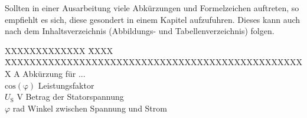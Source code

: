 \label{kap:symbole}

Sollten in einer Ausarbeitung viele Abkürzungen und Formelzeichen auftreten, so
empfiehlt es sich, diese gesondert in einem Kapitel aufzufuhren. Dieses kann auch nach
dem Inhaltsverzeichnis (Abbildungs- und Tabellenverzeichnis) folgen.
\begin{tabbing}
XXXXXXXXXXXXX \= XXXX \= XXXXXXXXXXXXXXXXXXXXXXXXXXXXXXXXXXXXXXXXXXXXXXXXX \kill
A									\>										\> Abkürzung für ... \\
$\mathrm{cos(\varphi)}$				\>										\> Leistungsfaktor \\
$U_\mathrm{S}$						\> V									\> Betrag der Statorspannung \\
$\varphi$							\> rad									\> Winkel zwischen Spannung und Strom \\
\end{tabbing}